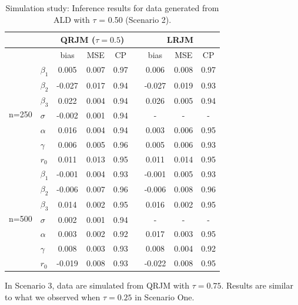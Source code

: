 \begin{table}[H]
\centering
\caption{Simulation study: Inference results for data generated from ALD with $\tau$ = 0.50 (Scenario 2).}
\label{tab:p2simsce2}
\begin{tabular}{clccccccc}
\hline
& & \multicolumn{3}{c}{QRJM ($\tau=0.5$)} & & \multicolumn{3}{c}{LRJM}\\
\hline
 & & bias & MSE & CP && bias & MSE & CP \\
 \cline{3-5}  \cline{7-9}
  \multirow{7}{*}{n=250} & $\beta_1$ & 0.005 & 0.007 & 0.97 && 0.006 & 0.008 & 0.97 \\
  & $\beta_2$ & -0.027 & 0.017 & 0.94 && -0.027 & 0.019 & 0.93 \\
  & $\beta_3$ & 0.022 & 0.004 & 0.94 && 0.026 & 0.005 & 0.94 \\
  & $\sigma$ & -0.002 & 0.001 & 0.94 &&  - & - & - \\
  & $\alpha$ & 0.016 & 0.004 & 0.94 && 0.003 & 0.006 & 0.95 \\
  & $\gamma$ & 0.006 & 0.005 & 0.96 && 0.005 & 0.006 & 0.93 \\
  & $r_0$ & 0.011 & 0.013 & 0.95 && 0.011 & 0.014 & 0.95 \\
   \hline
 \multirow{7}{*}{n=500} & $\beta_1$ & -0.001 & 0.004 & 0.93 && -0.001 & 0.005 & 0.93 \\
  & $\beta_2$ & -0.006 & 0.007 & 0.96 && -0.006 & 0.008 & 0.96 \\
  & $\beta_3$ & 0.014 & 0.002 & 0.95 && 0.016 & 0.002 & 0.95 \\
  & $\sigma$ & 0.002 & 0.001 & 0.94 &&  - & - & - \\
  & $\alpha$ & 0.003 & 0.002 & 0.92 && 0.017 & 0.003 & 0.95 \\
  & $\gamma$ & 0.008 & 0.003 & 0.93 && 0.008 & 0.004 & 0.92 \\
  & $r_0$ & -0.019 & 0.008 & 0.93 && -0.022 & 0.008 & 0.95 \\
   \hline
\end{tabular}
\end{table}



In Scenario 3, data are simulated from QRJM with $\tau=0.75$. Results are similar to what we observed when $\tau=0.25$ in Scenario One.

